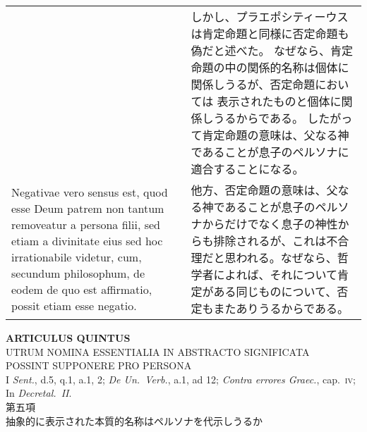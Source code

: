 \documentclass[10pt]{jsarticle} %
\begin{document}
\begin{longtable}{p{21em}p{21em}}
&

しかし、プラエポシティーウスは肯定命題と同様に否定命題も偽だと述べた。
なぜなら、肯定命題の中の関係的名称は個体に関係しうるが、否定命題においては
表示されたものと個体に関係しうるからである。
したがって肯定命題の意味は、父なる神であることが息子のペルソナに適合することになる。

\\



Negativae vero sensus est, quod esse Deum
patrem non tantum removeatur a persona filii, sed etiam a divinitate
eius sed hoc irrationabile videtur, cum, secundum philosophum, de eodem
de quo est affirmatio, possit etiam esse negatio.

&

他方、否定命題の意味は、父なる神であることが息子のペルソナからだけでなく息子の神性からも排除されるが、これは不合理だと思われる。なぜなら、哲学者によれば、それについて肯定がある同じものについて、否定もまたありうるからである。

\end{longtable}
\newpage


\begin{center}
 {\Large {\bf ARTICULUS QUINTUS}}\\
 {\large UTRUM NOMINA ESSENTIALIA IN ABSTRACTO SIGNIFICATA\\POSSINT SUPPONERE PRO PERSONA}\\
 {\footnotesize I \textit{Sent.}, d.5, q.1, a.1, 2; \textit{De Un.~Verb.}, a.1, ad 12; \textit{Contra errores Graec.}, cap.~\textsc{iv}; In \textit{Decretal.~II}.}\\
 {\Large 第五項\\抽象的に表示された本質的名称はペルソナを代示しうるか}
\end{center}
\end{document}
